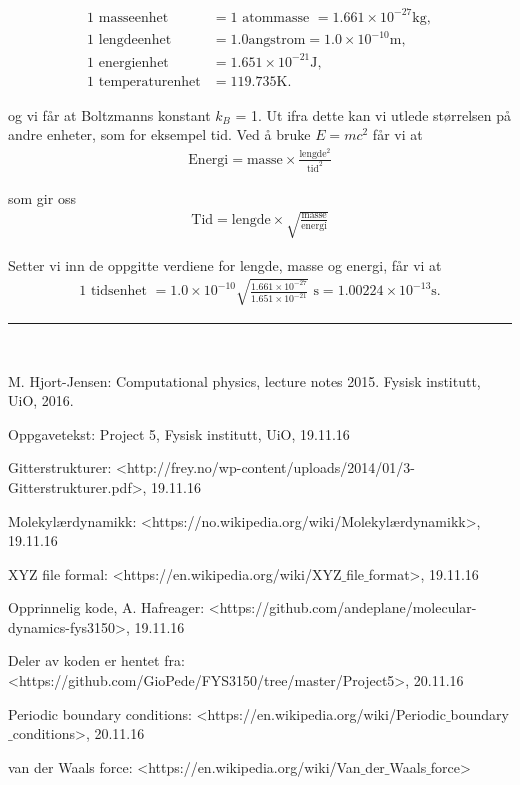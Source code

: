 \documentclass[paper=a4, fontsize=11pt]{scrartcl} %
\numberwithin{equation}{section} %
\numberwithin{figure}{section} %
\numberwithin{table}{section} %
\newcommand{\horrule}[1]{\rule{\linewidth}{#1}} %
\begin{document}
\begin{align}
	\text{1 masseenhet } &= 1 \text{ atommasse } = 1.661\times 10^{-27}\mathrm{kg},\\
	\text{1 lengdeenhet } &= 1.0 \mathrm{angstrom} = 1.0\times 10^{-10}\mathrm{m},\\
	\text{1 energienhet } &= 1.651\times 10^{-21}\mathrm{J},\\
	\text{1 temperaturenhet} &= 119.735\mathrm{K}.
\end{align}

og vi får at Boltzmanns konstant $k_B$ = 1. Ut ifra dette kan vi utlede størrelsen på andre enheter, som for eksempel tid. Ved å bruke $E = mc^2$ får vi at
\begin{align}
\text{Energi} = \text{masse} \times \frac{\text{lengde}^2}{\text{tid}^2}
\end{align}

som gir oss 
\begin{align}
\text{Tid} = \text{lengde} \times \sqrt{\frac{\text{masse}}{\text{energi}}}
\end{align}

Setter vi inn de oppgitte verdiene for lengde, masse og energi, får vi at
\begin{align}
\text{1 tidsenhet } = 1.0 \times 10^{-10}\sqrt{\frac{1.661\times 10^{-27}}{1.651\times 10^{-21}}} \text{ s} = 1.00224\times 10^{-13}\mathrm{s}.
\end{align}

\horrule{2pt} \\[0.5cm] %


\begin{thebibliography}{9}  
    
\bibitem{}
   M. Hjort-Jensen: Computational physics, lecture notes 2015. Fysisk institutt, UiO, 2016.

\bibitem{}
   Oppgavetekst: Project 5, Fysisk institutt, UiO, 19.11.16
   
\bibitem{}
 Gitterstrukturer: <http://frey.no/wp-content/uploads/2014/01/3-Gitterstrukturer.pdf>, 19.11.16  
 
 \bibitem{}
  Molekylærdynamikk: <https://no.wikipedia.org/wiki/Molekyl$æ$rdynamikk>, 19.11.16
  
\bibitem{}
 XYZ file formal: <https://en.wikipedia.org/wiki/XYZ$\_$file$\_$format>, 19.11.16
 
 \bibitem{}
 Opprinnelig kode, A. Hafreager: <https://github.com/andeplane/molecular-dynamics-fys3150>, 19.11.16
  
\bibitem{}
  Deler av koden er hentet fra: <https://github.com/GioPede/FYS3150/tree/master/Project5>,
  20.11.16
  
 \bibitem{}
 Periodic boundary conditions: <https://en.wikipedia.org/wiki/Periodic$\_$boundary$\_$conditions>, 20.11.16
 
 \bibitem{}
 van der Waals force: <https://en.wikipedia.org/wiki/Van$\_$der$\_$Waals$\_$force>

   
\end{thebibliography}
\end{document}
